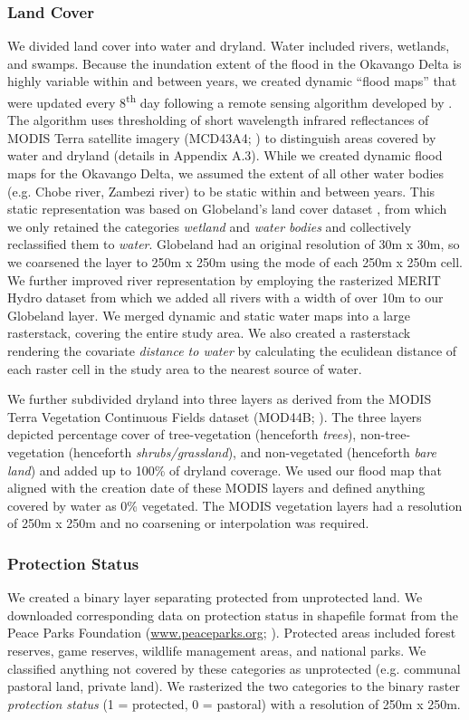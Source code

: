 \documentclass[abstract=on,10pt,a4paper,bibliography=totocnumbered]{article}
\begin{document}
\subsubsection{Land Cover}
We divided land cover into water and dryland. Water included rivers, wetlands,
and swamps. Because the inundation extent of the flood in the Okavango Delta is
highly variable within and between years, we created dynamic ``flood maps'' that
were updated every 8\textsuperscript{th} day following a remote sensing
algorithm developed by \cite{Wolski.2017}. The algorithm uses thresholding of
short wavelength infrared reflectances of MODIS Terra satellite imagery
(MCD43A4; \citealp{Schaaf.2015}) to distinguish areas covered by water and
dryland (details in Appendix A.3). While we created dynamic flood maps for the
Okavango Delta, we assumed the extent of all other water bodies (e.g. Chobe
river, Zambezi river) to be static within and between years. This static
representation was based on Globeland's land cover dataset \citep{Chen.2015},
from which we only retained the categories \textit{wetland} and \textit{water
bodies} and collectively reclassified them to \textit{water}. Globeland had an
original resolution of 30m x 30m, so we coarsened the layer to 250m x 250m using
the mode of each 250m x 250m cell. We further improved river representation by
employing the rasterized MERIT Hydro dataset \citep{Yamazaki.2019} from which we
added all rivers with a width of over 10m to our Globeland layer. We merged
dynamic and static water maps into a large rasterstack, covering the entire
study area. We also created a rasterstack rendering the covariate
\textit{distance to water} by calculating the eculidean distance of each raster
cell in the study area to the nearest source of water.

We further subdivided dryland into three layers as derived from the MODIS Terra
Vegetation Continuous Fields dataset (MOD44B; \citealp{Dimiceli.2015}). The
three layers depicted percentage cover of tree-vegetation (henceforth
\textit{trees}), non-tree-vegetation (henceforth \textit{shrubs/grassland}), and
non-vegetated (henceforth \textit{bare land}) and added up to 100\% of dryland
coverage. We used our flood map that aligned with the creation date of these
MODIS layers and defined anything covered by water as 0\% vegetated. The MODIS
vegetation layers had a resolution of 250m x 250m and no coarsening or
interpolation was required.

\subsubsection{Protection Status}
We created a binary layer separating protected from unprotected land. We
downloaded corresponding data on protection status in shapefile format from the
Peace Parks Foundation (\url{www.peaceparks.org}; \citealp{PeaceParks.2019}).
Protected areas included forest reserves, game reserves, wildlife management
areas, and national parks. We classified anything not covered by these
categories as unprotected (e.g. communal pastoral land, private land). We
rasterized the two categories to the binary raster \textit{protection status} (1
= protected, 0 = pastoral) with a resolution of 250m x 250m.
\end{document}
